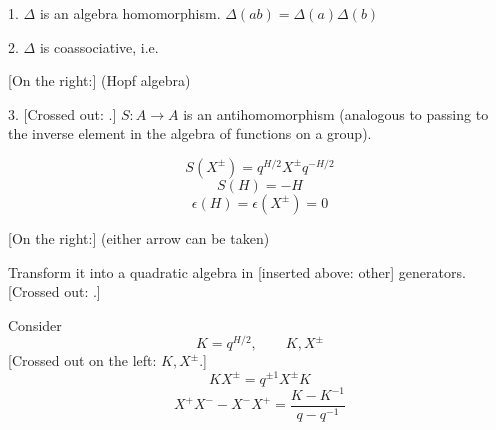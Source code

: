 1. $\Delta$ is an algebra homomorphism. $\Delta(ab)=\Delta(a)\Delta(b)$

2. $\Delta$ is coassociative, i.e.
\begin{center}
\end{center}
[On the right:] (Hopf algebra)

3. [Crossed out: .]
$S:A\to A$ is an antihomomorphism (analogous to passing to the inverse
element in the algebra of functions on a group).

\begin{equation*}
S(X^\pm)=q^{H/2}X^\pm q^{-H/2}
\tag{4}
\end{equation*}
\begin{equation*}
S(H)=-H
\end{equation*}
\begin{equation*}
\epsilon(H)=\epsilon(X^\pm)=0
\end{equation*}

\begin{center}
\end{center}
[On the right:] (either arrow can be taken)

Transform it into a quadratic algebra in [inserted above: other] generators.
[Crossed out: .]

Consider
\begin{equation*}
K=q^{H/2},\qquad K,X^\pm
\end{equation*}
[Crossed out on the left: $K,X^\pm$.]
\begin{equation*}
KX^\pm=q^{\pm1}X^\pm K
\end{equation*}
\begin{equation*}
X^+X^- -X^-X^+=\frac{K-K^{-1}}{q-q^{-1}}
\end{equation*}

